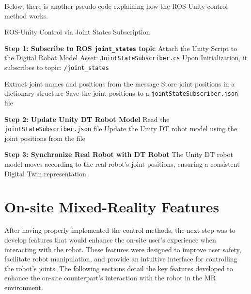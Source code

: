     Below, there is another pseudo-code explaining how the \ac{ROS}-Unity control method works.
    \begin{algorithm}
        \caption{ROS-Unity Control via Joint States Subscription}\label{alg:ros_unity_control}
        \begin{algorithmic}[1]
            \State \textbf{Step 1: Subscribe to ROS \texttt{joint\_states} topic}
            \State Attach the Unity Script to the Digital Robot Model Asset: \texttt{JointStateSubscriber.cs}
            \State Upon Initialization, it subscribes to topic: \texttt{/joint\_states}
    
                \State Extract joint names and positions from the message
                \State Store joint positions in a dictionary structure
                \State Save the joint positions to a \texttt{jointStateSubscriber.json} file
            \EndWhile
    
            \State \textbf{Step 2: Update Unity \ac{DT} Robot Model}
                \State Read the \texttt{jointStateSubscriber.json} file
                \State Update the Unity \ac{DT} robot model using the joint positions from the file
            \EndWhile
    
            \State \textbf{Step 3: Synchronize Real Robot with \ac{DT} Robot}
            \State The Unity \ac{DT} robot model moves according to the real robot’s joint positions, ensuring a consistent Digital Twin representation.
        \end{algorithmic}
    \end{algorithm}
    

 
\section{On-site Mixed-Reality Features}
\label{section:on-site-features}
After having properly implemented the control methods, the next step was to develop features that would enhance the on-site user's experience when interacting with the robot. These features were designed to improve user safety, facilitate robot manipulation, and provide an intuitive interface for controlling the robot's joints. The following sections detail the key features developed to enhance the on-site counterpart's interaction with the robot in the \ac{MR} environment.

